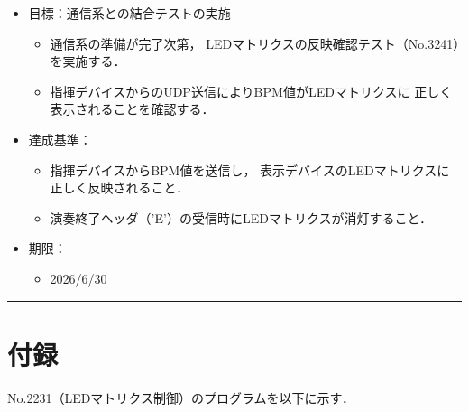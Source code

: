 \documentclass[uplatex,dvipdfmx,a4paper,11pt]{jsarticle}
\newcommand{\sectionrule}{\par\medskip\noindent\rule{\linewidth}{0.6pt}\par\medskip}
\begin{document}
\begin{itemize}

  \item 目標：通信系との結合テストの実施
    \begin{itemize}
      \item 通信系の準備が完了次第，
      LEDマトリクスの反映確認テスト（No.3241）を実施する．

      \item 指揮デバイスからのUDP送信によりBPM値がLEDマトリクスに
      正しく表示されることを確認する．
    \end{itemize}

  \item 達成基準：
    \begin{itemize}
      \item 指揮デバイスからBPM値を送信し，
      表示デバイスのLEDマトリクスに正しく反映されること．

      \item 演奏終了ヘッダ（'E'）の受信時にLEDマトリクスが消灯すること．
    \end{itemize}

  \item 期限：
    \begin{itemize}
      \item 2026/6/30
    \end{itemize}

\end{itemize}


\sectionrule


\section{付録}

No.2231（LEDマトリクス制御）のプログラムを以下に示す．
\end{document}
